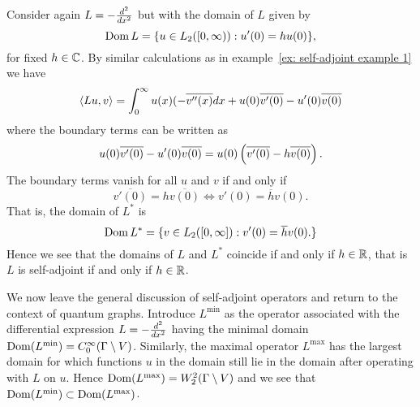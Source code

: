 {\begin{example}
  Consider again $L = -\frac{d^2}{dx^2}$ but with the domain of $L$ given by
  \[
    \operatorname{Dom} L = \{u \in L_2([0, \infty)) : u'(0) = h u(0) \},
  \]
  for fixed $h\in\mathbb{C}$.
  By similar calculations as in example~\ref{ex: self-adjoint example 1} we have
  \begin{align*}
    \langle Lu, v \rangle = \int_{0}^{\infty} u(x)(-\overline{v''(x)} dx + u(0)\overline{v'(0)} - u'(0)\overline{v(0)}
  \end{align*}
  where the boundary terms can be written as
  \begin{align*}
    u(0)\overline{v'(0)} - u'(0)\overline{v(0)} = u(0) \left(\overline{v'(0)}-h\overline{v(0)}\right).
  \end{align*}
  The boundary terms vanish for all $u$ and $v$ if and only if
  \begin{equation}\label{eq: self-adjoint example 2 boundary terms}
    \overline{v'(0)} = h\overline{v(0)} \iff v'(0) = \overline{h} v(0).
  \end{equation}
  That is, the domain of $L^*$ is
  \[
    \operatorname{Dom} L^* = \{ v \in L_2([0,\infty]) : v'(0) = \overline{h} v(0). \}
  \]
  Hence we see that the domains of $L$ and $L^*$ coincide if and only if $h \in \mathbb{R}$, that is $L$ is self-adjoint if and only if $h\in\mathbb{R}$.
\end{example}
}


We now leave the general discussion of self-adjoint operators and return to the context of quantum graphs. Introduce $L^\text{min}$ as the operator associated with the differential expression $L = -\frac{d^2}{dx^2}$ having the minimal domain $\operatorname{Dom}(L^\text{min}) = C^\infty_0(\Gamma\setminus V)$. Similarly, the maximal operator $L^\text{max}$ has the largest domain for which functions $u$ in the domain still lie in the domain after operating with $L$ on $u$. Hence $\operatorname{Dom}(L^\text{max}) = W^2_2(\Gamma\setminus V)$ and we see that $\operatorname{Dom}(L^\text{min}) \subset \operatorname{Dom}(L^\text{max})$.

